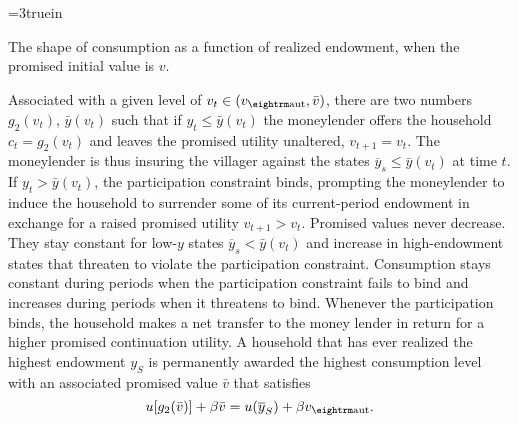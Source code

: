 
\centerline{\epsfxsize=3truein}
\caption{The shape of consumption as a function of realized endowment, when the promised
initial value is $v$.}
\endfigure

 Associated with a given level of $v_t \in
(v_{\rm aut}, \bar v)$, there are two numbers $g_2(v_t)$, $\bar y(v_t)$
such that
 if $y_t \leq \bar y(v_t)$
 the moneylender offers the household $c_t=g_2(v_t)$
and  leaves the promised utility unaltered, $v_{t+1}=v_t$.
The moneylender is thus insuring the villager against the
states $\overline y_s \leq \bar y(v_t)$ at time $t$.
If $y_t > \bar y(v_t)$, the participation constraint  binds,
prompting the moneylender to induce the household
to surrender some of its current-period
endowment in exchange for a raised promised utility
$v_{t+1} > v_t$.  Promised values never decrease.  They stay constant
for low-$y$ states $\overline y_s < \bar y(v_t)$ and
increase in high-endowment states that threaten
to violate the participation constraint.  Consumption stays constant
during periods when the participation constraint fails to bind
and increases  during periods when it threatens to bind. Whenever the participation binds, the household makes a net transfer
to the money lender in return for a higher promised continuation utility.  A household that has ever realized the highest endowment $y_S$ is
permanently awarded the highest consumption level with an
associated promised value $\bar v$ that satisfies
$$u[g_2(\bar v)] + \beta \bar v = u(\overline y_S) + \beta v_{\rm aut}.$$

